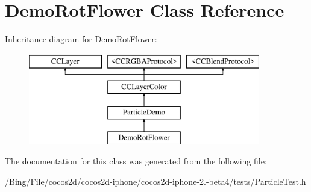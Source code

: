 \hypertarget{interface_demo_rot_flower}{\section{Demo\-Rot\-Flower Class Reference}
\label{interface_demo_rot_flower}
}
Inheritance diagram for Demo\-Rot\-Flower\-:\begin{figure}[H]
\begin{center}
\leavevmode
\includegraphics[height=4.000000cm]{interface_demo_rot_flower}
\end{center}
\end{figure}


The documentation for this class was generated from the following file\-:\begin{DoxyCompactItemize}
\item 
/\-Bing/\-File/cocos2d/cocos2d-\/iphone/cocos2d-\/iphone-\/2.-\/beta4/tests/Particle\-Test.\-h\end{DoxyCompactItemize}
